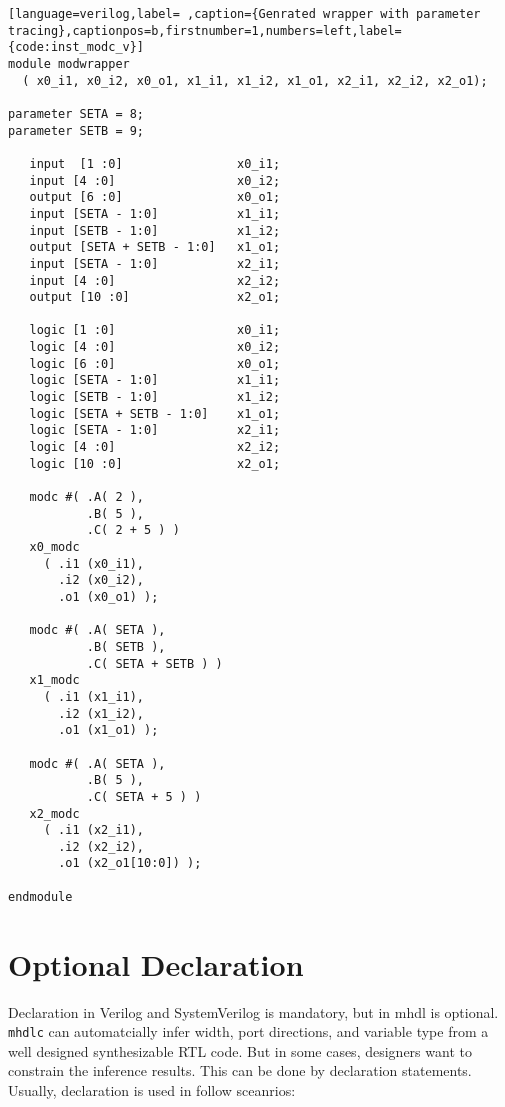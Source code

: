 \documentclass[10pt,oneside]{book}
\begin{document}
\begin{lstlisting}[language=verilog,label= ,caption={Genrated wrapper with parameter tracing},captionpos=b,firstnumber=1,numbers=left,label={code:inst_modc_v}]
module modwrapper
  ( x0_i1, x0_i2, x0_o1, x1_i1, x1_i2, x1_o1, x2_i1, x2_i2, x2_o1);

parameter SETA = 8; 
parameter SETB = 9;

   input  [1 :0]                x0_i1;
   input [4 :0]                 x0_i2;
   output [6 :0]                x0_o1;
   input [SETA - 1:0]           x1_i1;
   input [SETB - 1:0]           x1_i2;
   output [SETA + SETB - 1:0]   x1_o1;
   input [SETA - 1:0]           x2_i1;
   input [4 :0]                 x2_i2;
   output [10 :0]               x2_o1;

   logic [1 :0]                 x0_i1;
   logic [4 :0]                 x0_i2;
   logic [6 :0]                 x0_o1;
   logic [SETA - 1:0]           x1_i1;
   logic [SETB - 1:0]           x1_i2;
   logic [SETA + SETB - 1:0]    x1_o1;
   logic [SETA - 1:0]           x2_i1;
   logic [4 :0]                 x2_i2;
   logic [10 :0]                x2_o1;

   modc #( .A( 2 ), 
           .B( 5 ), 
           .C( 2 + 5 ) ) 
   x0_modc
     ( .i1 (x0_i1),
       .i2 (x0_i2), 
       .o1 (x0_o1) );
   
   modc #( .A( SETA ), 
           .B( SETB ), 
           .C( SETA + SETB ) ) 
   x1_modc
     ( .i1 (x1_i1), 
       .i2 (x1_i2),
       .o1 (x1_o1) );

   modc #( .A( SETA ), 
           .B( 5 ), 
           .C( SETA + 5 ) ) 
   x2_modc
     ( .i1 (x2_i1), 
       .i2 (x2_i2),
       .o1 (x2_o1[10:0]) );

endmodule
\end{lstlisting}

\section{Optional Declaration}
\label{sec:org4348cb9}
Declaration in Verilog and SystemVerilog is mandatory, but in mhdl is
optional.  \texttt{mhdlc} can automatcially infer width, port directions, and
variable type from a well designed synthesizable RTL code.  But in
some cases, designers want to constrain the inference results.  This can
be done by declaration statements.  Usually, declaration is used in
follow sceanrios:
\end{document}
